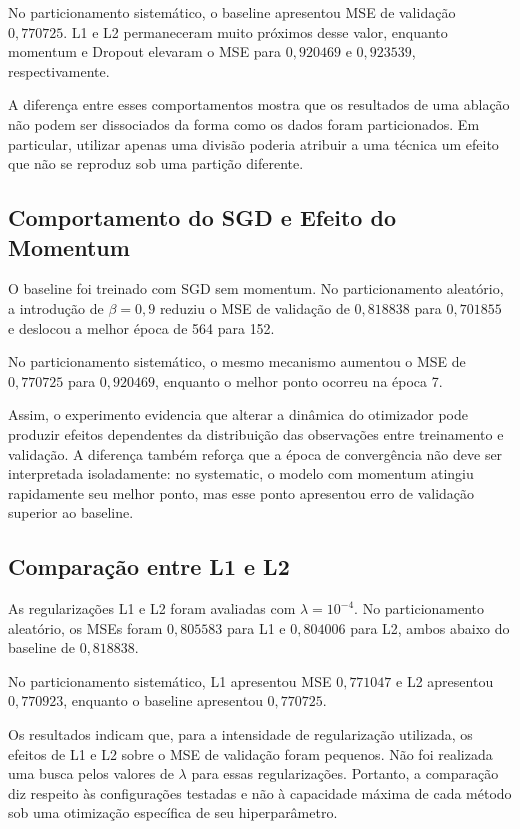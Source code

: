 \documentclass[11pt,a4paper]{article}
\begin{document}
No particionamento sistemático, o baseline apresentou MSE de validação
$0,770725$. L1 e L2 permaneceram muito próximos desse valor, enquanto
momentum e Dropout elevaram o MSE para $0,920469$ e $0,923539$,
respectivamente.

A diferença entre esses comportamentos mostra que os resultados de uma
ablação não podem ser dissociados da forma como os dados foram
particionados. Em particular, utilizar apenas uma divisão poderia
atribuir a uma técnica um efeito que não se reproduz sob uma
partição diferente.


\subsection{Comportamento do SGD e Efeito do Momentum}

O baseline foi treinado com SGD sem momentum. No particionamento
aleatório, a introdução de $\beta=0,9$ reduziu o MSE de validação de
$0,818838$ para $0,701855$ e deslocou a melhor época de 564 para 152.

No particionamento sistemático, o mesmo mecanismo aumentou o MSE de
$0,770725$ para $0,920469$, enquanto o melhor ponto ocorreu na época 7.

Assim, o experimento evidencia que alterar a dinâmica do otimizador
pode produzir efeitos dependentes da distribuição das observações entre
treinamento e validação. A diferença também reforça que a época de
convergência não deve ser interpretada isoladamente: no systematic, o
modelo com momentum atingiu rapidamente seu melhor ponto, mas esse
ponto apresentou erro de validação superior ao baseline.


\subsection{Comparação entre L1 e L2}

As regularizações L1 e L2 foram avaliadas com $\lambda=10^{-4}$. No
particionamento aleatório, os MSEs foram $0,805583$ para L1 e
$0,804006$ para L2, ambos abaixo do baseline de $0,818838$.

No particionamento sistemático, L1 apresentou MSE $0,771047$ e L2
apresentou $0,770923$, enquanto o baseline apresentou $0,770725$.

Os resultados indicam que, para a intensidade de regularização
utilizada, os efeitos de L1 e L2 sobre o MSE de validação foram
pequenos. Não foi realizada uma busca pelos valores de $\lambda$ para
essas regularizações. Portanto, a comparação diz respeito às
configurações testadas e não à capacidade máxima de cada método sob uma
otimização específica de seu hiperparâmetro.
\end{document}
